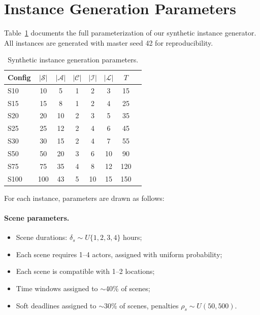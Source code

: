 \appendix

\section{Instance Generation Parameters}
\label{app:instances}

Table~\ref{tab:instance_params} documents the full parameterization of our synthetic instance generator.
All instances are generated with master seed 42 for reproducibility.

\begin{table}[h]
\centering
\caption{Synthetic instance generation parameters.}
\label{tab:instance_params}
\small
\begin{tabular}{lccccccc}
\toprule
\textbf{Config} & $|\mathcal{S}|$ & $|\mathcal{A}|$ & $|\mathcal{C}|$ & $|\mathcal{I}|$ & $|\mathcal{L}|$ & $T$ \\
\midrule
S10  & 10  & 5   & 1  & 2  & 3  & 15  \\
S15  & 15  & 8   & 1  & 2  & 4  & 25  \\
S20  & 20  & 10  & 2  & 3  & 5  & 35  \\
S25  & 25  & 12  & 2  & 4  & 6  & 45  \\
S30  & 30  & 15  & 2  & 4  & 7  & 55  \\
S50  & 50  & 20  & 3  & 6  & 10 & 90  \\
S75  & 75  & 35  & 4  & 8  & 12 & 120 \\
S100 & 100 & 43  & 5  & 10 & 15 & 150 \\
\bottomrule
\end{tabular}
\end{table}

For each instance, parameters are drawn as follows:

\paragraph{Scene parameters.}
\begin{itemize}
    \item Scene durations: $\delta_s \sim U\{1, 2, 3, 4\}$ hours;
    \item Each scene requires 1--4 actors, assigned with uniform probability;
    \item Each scene is compatible with 1--2 locations;
    \item Time windows assigned to $\sim$40\% of scenes;
    \item Soft deadlines assigned to $\sim$30\% of scenes, penalties $\rho_s \sim U(50, 500)$.
\end{itemize}

